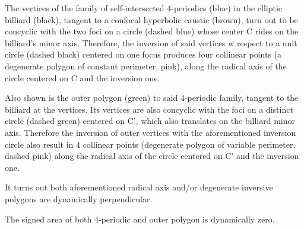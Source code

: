 The vertices of the family of self-intersected 4-periodics (blue) in the elliptic billiard (black), tangent to a confocal hyperbolic caustic (brown), turn out to be concyclic with the two foci on a circle (dashed blue) whose center C rides on the billiard's minor axis. Therefore, the inversion of said vertices w respect to a unit circle (dashed black) centered on one focus produces four collinear points (a degenerate polygon of constant perimeter, pink), along the radical axis of the circle centered on C and the inversion one.

Also shown is the outer polygon (green) to said 4-periodic family, tangent to the billiard at the vertices. Its vertices are also concyclic with the foci on a distinct circle (dashed green) centered on C', which also translates on the billiard minor axis. Therefore the inversion of outer vertices with the aforementioned inversion circle also result in 4 collinear points (degenerate polygon of variable perimeter, dashed pink) along the radical axis of the circle centered on C' and the inversion one.

It turns out both aforementioned radical axis and/or degenerate inversive polygons are dynamically perpendicular.

The signed area of both 4-periodic and outer polygon is dynamically zero.